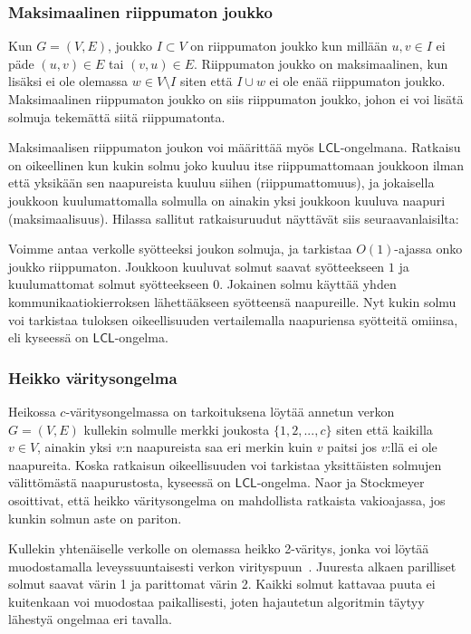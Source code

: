 \documentclass[12pt,finnish]{tktltiki2}
\theoremstyle{definition}
\theoremstyle{remark}
\newcommand*{\lcl}{\ensuremath{\mathsf{LCL}}}
\begin{document}
\subsubsection{Maksimaalinen riippumaton joukko}
Kun $G = (V, E)$, joukko $I \subset V$ on riippumaton joukko kun millään $u, v \in I$ ei päde $(u, v) \in E$  tai $(v, u) \in E$. Riippumaton joukko on maksimaalinen, kun lisäksi ei ole olemassa $w \in V \setminus I$ siten että $I \cup {w}$ ei ole enää riippumaton joukko. Maksimaalinen riippumaton joukko on siis riippumaton joukko, johon ei voi lisätä solmuja tekemättä siitä riippumatonta.

Maksimaalisen riippumaton joukon voi määrittää myös \lcl -ongelmana. Ratkaisu on oikeellinen kun kukin solmu joko kuuluu itse riippumattomaan joukkoon ilman että yksikään sen naapureista kuuluu siihen (riippumattomuus), ja jokaisella joukkoon kuulumattomalla solmulla on ainakin yksi joukkoon kuuluva naapuri (maksimaalisuus). Hilassa sallitut ratkaisuruudut näyttävät siis seuraavanlaisilta:

Voimme antaa verkolle syötteeksi joukon solmuja, ja tarkistaa $O(1)$-ajassa onko joukko riippumaton. Joukkoon kuuluvat solmut saavat syötteekseen $1$ ja kuulumattomat solmut syötteekseen $0$. Jokainen solmu käyttää yhden kommunikaatiokierroksen lähettääkseen syötteensä naapureille. Nyt kukin solmu voi tarkistaa tuloksen oikeellisuuden vertailemalla naapuriensa syötteitä omiinsa, eli kyseessä on \lcl -ongelma.


\iffalse
\subsubsection{Heikko väritysongelma}
Heikossa $c$-väritysongelmassa on tarkoituksena löytää annetun verkon $G = (V, E)$ kullekin solmulle merkki joukosta $\{1, 2, ..., c\}$ siten että kaikilla $v \in V$, ainakin yksi $v$:n naapureista saa eri merkin kuin $v$ paitsi jos $v$:llä ei ole naapureita. Koska ratkaisun oikeellisuuden voi tarkistaa yksittäisten solmujen välittömästä naapurustosta, kyseessä on \lcl -ongelma. Naor ja Stockmeyer~\cite{naor95} osoittivat, että heikko väritysongelma on mahdollista ratkaista vakioajassa, jos kunkin solmun aste on pariton.

Kullekin yhtenäiselle verkolle on olemassa heikko 2-väritys, jonka voi löytää muodostamalla leveyssuuntaisesti verkon virityspuun~\cite{naor95}. Juuresta alkaen parilliset solmut saavat värin 1 ja parittomat värin 2. Kaikki solmut kattavaa puuta ei kuitenkaan voi muodostaa paikallisesti, joten hajautetun algoritmin täytyy lähestyä ongelmaa eri tavalla.
\end{document}
